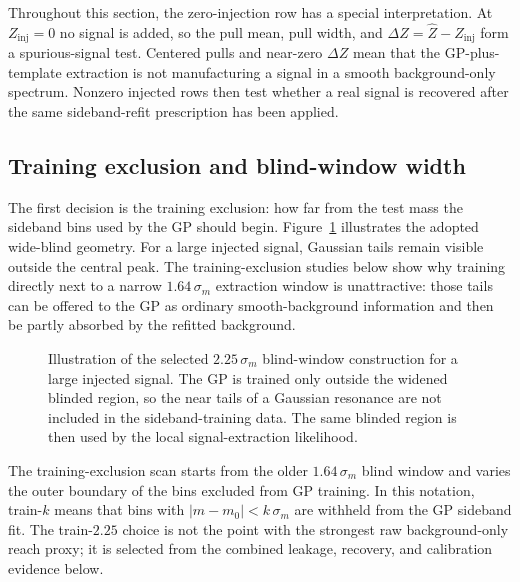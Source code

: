 Throughout this section, the zero-injection row has a special interpretation. At
$Z_{\mathrm{inj}}=0$ no signal is added, so the pull mean, pull width, and
$\Delta Z=\hat Z-Z_{\mathrm{inj}}$ form a spurious-signal test. Centered pulls and
near-zero $\Delta Z$ mean that the GP-plus-template extraction is not manufacturing a
signal in a smooth background-only spectrum. Nonzero injected rows then test whether a
real signal is recovered after the same sideband-refit prescription has been applied.

\subsection{Training exclusion and blind-window width}
\label{subsec:guard-band-construction}

The first decision is the training exclusion: how far from the test mass the sideband bins used by the GP should begin. Figure~\ref{fig:blind225-cartoon} illustrates the adopted wide-blind geometry. For a large injected signal, Gaussian tails remain visible outside the central peak. The training-exclusion studies below show why training directly next to a narrow $1.64\,\sigma_m$ extraction window is unattractive: those tails can be
offered to the GP as ordinary smooth-background information and then be partly absorbed
by the refitted background.

\begin{figure}[H]
\centering
{}
\caption{Illustration of the selected $2.25\,\sigma_m$ blind-window construction for a
large injected signal. The GP is trained only outside the widened blinded region, so the
near tails of a Gaussian resonance are not included in the sideband-training data. The
same blinded region is then used by the local signal-extraction likelihood.}
\label{fig:blind225-cartoon}
\end{figure}

The training-exclusion scan starts from the older $1.64\,\sigma_m$ blind window and
varies the outer boundary of the bins excluded from GP training. In this notation,
train-$k$ means that bins with $|m-m_0|<k\,\sigma_m$ are withheld from the GP sideband
fit. The train-$2.25$ choice is not the point with the strongest raw background-only
reach proxy; it is selected from the combined leakage, recovery, and calibration
evidence below.


